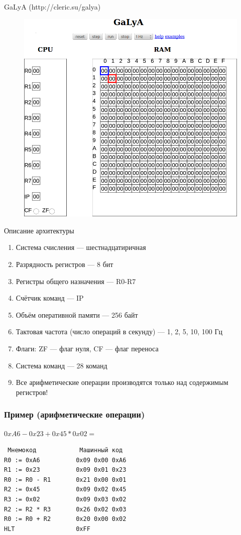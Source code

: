 \documentclass{beamer}
\begin{document}
    \subsection{}
    \begin{frame}{GaLyA (http://cleric.su/galya)}
    \begin{figure}
        \includegraphics[width=0.7\linewidth]{fig/galya.png}
    \end{figure}
    \end{frame}
    \begin{frame}{Описание архитектуры}
        \begin{enumerate}
            \item Система счисления --- шестнадцатиричная
            \item Разрядность регистров --- 8 бит
            \item Регистры общего назначения --- R0-R7
            \item Счётчик команд --- IP
            \item Объём оперативной памяти --- 256 байт
            \item Тактовая частота (число операций в секунду) --- 1, 2, 5, 10, 100 Гц
            \item Флаги: ZF --- флаг нуля, CF --- флаг переноса
            \item Система команд --- 28 команд
            \item Все арифметические операции производятся только над содержимым регистров!
        \end{enumerate}
    \end{frame}
    \begin{frame}[fragile]
        \frametitle{Пример (арифметические операции)}
        \begin{block}{$0xA6 - 0x23 + 0x45*0x02 = $}
        \begin{verbatim}
 Мнемокод            Машинный код
R0 := 0xA6          0x09 0x00 0xA6
R1 := 0x23          0x09 0x01 0x23
R0 := R0 - R1       0x21 0x00 0x01
R2 := 0x45          0x09 0x02 0x45
R3 := 0x02          0x09 0x03 0x02
R2 := R2 * R3       0x26 0x02 0x03
R0 := R0 + R2       0x20 0x00 0x02
HLT                 0xFF
        \end{verbatim}
        \end{block}
\end{frame}
\end{document}
